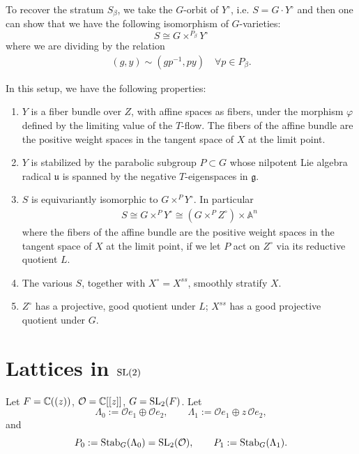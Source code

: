 \documentclass[12pt]{article}
\begin{document}
To recover the stratum $S_\beta$, we take the $G$-orbit of $Y^\circ$, i.e. $S = G \cdot Y^\circ$ and then one can show that we have the following isomorphism of $G$-varieties:
\[S \cong G \times^{P_{\beta}} Y^\circ\]
where we are dividing by the relation \begin{align*}
    (g, y) \sim (gp^{-1}, py) \quad \forall p \in P_\beta.
\end{align*}
\begin{proposition}
In this setup, we have the following properties:
\begin{enumerate}
\item[(i)][Bialynicki-Birula decomposition]
$Y$ is a fiber bundle over $Z$, with affine spaces as fibers, under the
morphism $\varphi$ defined by the limiting value of the $T$-flow. The fibers of the affine bundle are the positive weight spaces in the tangent space of $X$ at the limit point.

\item[(ii)]
$Y$ is stabilized by the parabolic subgroup $P \subset G$ whose nilpotent
Lie algebra radical $\mathfrak u$ is spanned by the negative $T$-eigenspaces
in $\mathfrak g$.

\item[(iii)]
$S$ is equivariantly isomorphic to $G \times^P Y^\circ$. In particular \begin{align*}
    S \cong G \times^P Y^\circ \cong (G \times^P Z^\circ) \times \mathbb A^n 
\end{align*} where the fibers of the affine bundle are the positive weight spaces in the tangent space of $X$ at the limit point, if we let $P$ act on $Z^\circ$ via its reductive quotient $L$.

\item[(iv)]
The various $S$, together with $X^\circ = X^{ss}$, smoothly stratify $X$.

\item[(v)]
$Z^\circ$ has a projective, good quotient under $L$; $X^{ss}$ has a good projective quotient under $G$.
\end{enumerate}
\end{proposition}

\section{Lattices in $\operatorname{SL}(2)$}
Let $F=\mathbb{C}((z))$, $\mathcal O=\mathbb{C}[[z]]$, $G=\operatorname{SL}_2(F)$.
Let
$$\Lambda_0:=\mathcal O e_1\oplus \mathcal O e_2,\qquad
\Lambda_1:=\mathcal O e_1\oplus z\,\mathcal O e_2,$$
and
$$P_0:=\operatorname{Stab}_G(\Lambda_0)=\operatorname{SL}_2(\mathcal O),\qquad
P_1:=\operatorname{Stab}_G(\Lambda_1).$$
\end{document}
